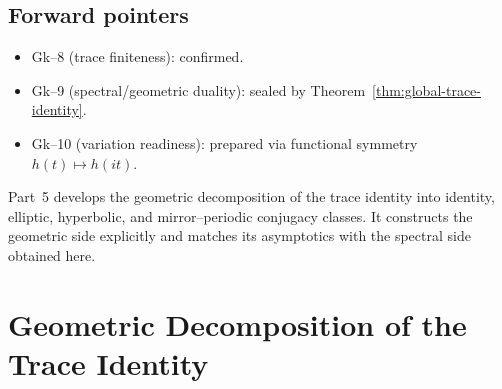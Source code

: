 \subsection{Forward pointers}
\label{subsec:ch6-part4-forward} \relax

\begin{itemize}[leftmargin=*, itemsep=2pt]
  \item Gk–8 (trace finiteness): confirmed. %
  \item Gk–9 (spectral/geometric duality): sealed by Theorem~\ref{thm:global-trace-identity}. %
  \item Gk–10 (variation readiness): prepared via functional symmetry $h(t)\mapsto h(it)$. %
\end{itemize}

Part~5 develops the geometric decomposition of the trace identity into identity, elliptic, hyperbolic, and mirror–periodic conjugacy classes.  
It constructs the geometric side explicitly and matches its asymptotics with the spectral side obtained here. %



\section{Geometric Decomposition of the Trace Identity}
\label{sec:ch6-part5-geometric-decomposition} \relax \hspace{0pt}

